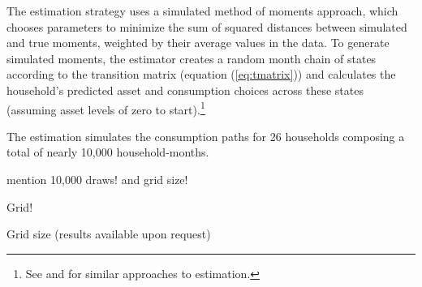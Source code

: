 \documentclass[12pt]{article}
\begin{document}
The estimation strategy uses a simulated method of moments approach, which chooses parameters to minimize the sum of squared distances between simulated and true moments, weighted by their average values in the data.  To generate simulated moments, the estimator creates a random month chain of states according to the transition matrix (equation (\ref{eq:tmatrix})) and calculates the household's predicted asset and consumption choices across these states (assuming asset levels of zero to start).\footnote{See \cite{laibson2007estimating} and \cite{gourinchas2002consumption} for similar approaches to estimation.}






The estimation simulates the consumption paths for 26 households composing a total of nearly 10,000 household-months.  




mention 10,000 draws! and grid size!  


Grid!

Grid size (results available upon request)


\begin{table}[H]
\centering
\caption{Calibrated and Assumed Parameters}\label{table:calibratedparam}
\vspace{-2mm}
\end{table}
\end{document}
